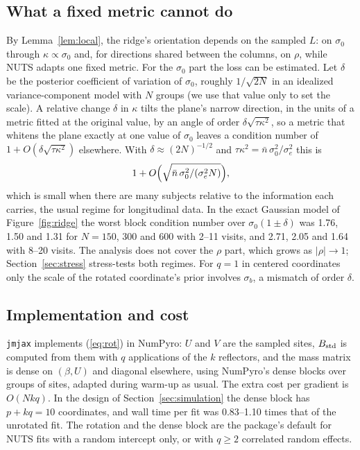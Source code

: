 \subsection{What a fixed metric cannot do}\label{sec:residual}

By Lemma~\ref{lem:local}, the ridge's orientation depends on the sampled
$L$: on $\sigma_0$ through $\kappa \propto \sigma_0$ and, for directions
shared between the columns, on $\rho$, while NUTS adapts one fixed metric.
For the $\sigma_0$ part the loss can be estimated. Let $\delta$ be the
posterior coefficient of variation of $\sigma_0$, roughly $1/\sqrt{2N}$ in
an idealized variance-component model with $N$ groups (we use that value
only to set the scale). A relative change
$\delta$ in $\kappa$ tilts the plane's narrow direction, in the units of a
metric fitted at the original value, by an angle of order
$\delta\sqrt{\tau\kappa^2}$, so a metric that whitens the plane exactly at
one value of $\sigma_0$ leaves a condition number of $1 +
O(\delta\sqrt{\tau\kappa^2})$ elsewhere. With $\delta
\approx (2N)^{-1/2}$ and $\tau\kappa^2 = \bar n\,\sigma_0^2/\sigma_e^2$
this is
\[
1 + O\Bigl(\sqrt{\bar n\,\sigma_0^2 / (\sigma_e^2 N)}\Bigr),
\]
which is small when there are many subjects relative to the information
each carries, the usual regime for longitudinal data. In the exact
Gaussian model of Figure~\ref{fig:ridge} the worst block condition number
over $\sigma_0 (1 \pm \delta)$ was 1.76, 1.50 and 1.31 for $N = 150$, 300
and 600 with 2--11 visits, and 2.71, 2.05 and 1.64 with 8--20 visits. The
analysis does not cover the $\rho$ part, which grows as $|\rho| \to 1$;
Section~\ref{sec:stress} stress-tests both regimes. For $q = 1$ in
centered coordinates only the scale of the rotated coordinate's prior
involves $\sigma_b$, a mismatch of order $\delta$.

\subsection{Implementation and cost}

\texttt{jmjax} implements (\ref{eq:rot}) in NumPyro: $U$ and $V$ are the
sampled sites, $B_{\mathrm{std}}$ is computed from them with $q$ applications of the
$k$ reflectors, and the mass matrix is dense on $(\beta, U)$ and diagonal
elsewhere, using NumPyro's dense blocks over groups of sites, adapted
during warm-up as usual. The extra cost per gradient is $O(Nkq)$. In the
design of Section~\ref{sec:simulation} the dense block has $p + kq = 10$
coordinates, and wall time per fit was 0.83--1.10 times that of the
unrotated fit. The rotation and the dense block are the package's default
for NUTS fits with a random intercept only, or with $q \geq 2$ correlated
random effects.
